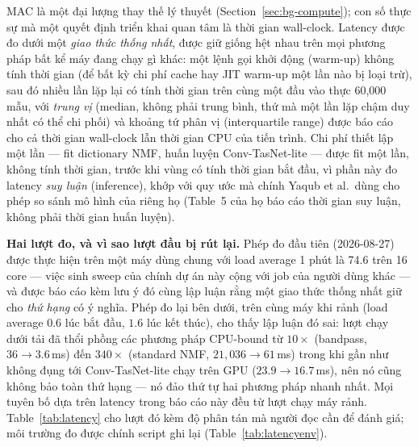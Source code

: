 \documentclass[11pt]{article}
\begin{document}
MAC là một đại lượng thay thế lý thuyết (Section~\ref{sec:bg-compute});
con số thực sự mà một quyết định triển khai quan tâm là thời gian
wall-clock. Latency được đo dưới một \emph{giao thức thống nhất}, được
giữ giống hệt nhau trên mọi phương pháp bất kể máy đang chạy gì khác:
một lệnh gọi khởi động (warm-up) không tính thời gian (để bất kỳ chi phí
cache hay JIT warm-up một lần nào bị loại trừ), sau đó nhiều lần lặp lại
có tính thời gian trên cùng một đầu vào thực 60{,}000 mẫu, với
\emph{trung vị} (median, không phải trung bình, thứ mà một lần lặp chậm
duy nhất có thể chi phối) và khoảng tứ phân vị (interquartile range)
được báo cáo cho cả thời gian wall-clock lẫn thời gian CPU của tiến
trình. Chi phí thiết lập một lần --- fit dictionary NMF, huấn luyện
Conv-TasNet-lite --- được fit một lần, không tính thời gian, trước khi
vùng có tính thời gian bắt đầu, vì phần này đo latency \emph{suy luận}
(inference), khớp với quy ước mà chính Yaqub et al.\ dùng cho phép so
sánh mô hình của riêng họ (Table~5 của họ báo cáo thời gian suy luận,
không phải thời gian huấn luyện).

\textbf{Hai lượt đo, và vì sao lượt đầu bị rút lại.} Phép đo đầu tiên
(2026-08-27) được thực hiện trên một máy dùng chung với load average 1
phút là 74.6 trên 16 core --- việc sinh sweep của chính dự án này cộng với
job của người dùng khác --- và được báo cáo kèm lưu ý đó cùng lập luận
rằng một giao thức thống nhất giữ cho \emph{thứ hạng} có ý nghĩa. Phép đo
lại bên dưới, trên cùng máy khi rảnh (load average $0.6$ lúc bắt đầu,
$1.6$ lúc kết thúc), cho thấy lập luận đó sai: lượt chạy dưới tải đã thổi
phồng các phương pháp CPU-bound từ $10\times$ (bandpass, $36 \to
3.6$\,ms) đến $340\times$ (standard NMF, $21{,}036 \to 61$\,ms) trong khi
gần như không đụng tới Conv-TasNet-lite chạy trên GPU ($23.9 \to
16.7$\,ms), nên nó cũng không bảo toàn thứ hạng --- nó đảo thứ tự hai
phương pháp nhanh nhất. Mọi tuyên bố dựa trên latency trong báo cáo này
đều từ lượt chạy máy rảnh. Table~\ref{tab:latency} cho lượt đó kèm độ
phân tán mà người đọc cần để đánh giá; môi trường đo được chính script
ghi lại (Table~\ref{tab:latencyenv}).
\end{document}
